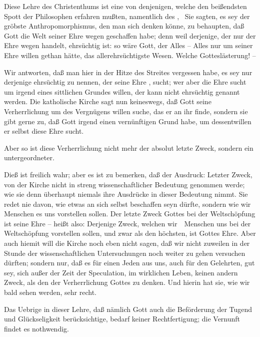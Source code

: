 \begin{aufza}
\item Diese Lehre des Christenthums ist eine von denjenigen, welche den beißendsten Spott der Philosophen erfahren mußten, namentlich des , \uA\ Sie sagten, es sey der gröbste Anthropomorphismus, den man sich denken könne, zu behaupten, daß Gott die Welt seiner Ehre wegen geschaffen habe; denn weil derjenige, der nur der Ehre wegen handelt, ehrsüchtig ist: so wäre Gott, der Alles -- Alles nur um seiner Ehre willen gethan hätte, das allerehrsüchtigste Wesen. Welche Gotteslästerung! --\par
{} Wir antworten, daß man hier in der Hitze des Streites vergessen habe, es sey nur derjenige ehrsüchtig zu nennen, der seine Ehre , sucht; wer aber die Ehre sucht um irgend eines sittlichen Grundes willen, der kann nicht ehrsüchtig genannt werden. Die katholische Kirche sagt nun keineswegs, daß Gott seine Verherrlichung um des Vergnügens willen suche, das er an ihr finde, sondern sie gibt gerne zu, daß Gott irgend einen vernünftigen Grund habe, um dessentwillen er selbst diese Ehre sucht.
\item {} Aber so ist diese Verherrlichung nicht mehr der absolut letzte Zweck, sondern ein untergeordneter.\par
{} Dieß ist freilich wahr; aber es ist zu bemerken, daß der Ausdruck: Letzter Zweck, von der Kirche nicht in streng wissenschaftlicher Bedeutung genommen werde; wie sie denn überhaupt niemals ihre Ausdrücke in dieser Bedeutung nimmt. Sie redet nie davon, wie etwas an sich selbst beschaffen seyn dürfte, sondern wie wir Menschen es uns vorstellen sollen. Der letzte Zweck Gottes bei der Weltschöpfung ist seine Ehre -- heißt also: Derjenige Zweck, welchen wir~\ Menschen uns bei der Weltschöpfung vorstellen sollen, und zwar als den höchsten, ist Gottes Ehre. Aber auch hiemit will die Kirche noch eben nicht sagen, daß wir nicht zuweilen in der Stunde der wissenschaftlichen Untersuchungen noch weiter zu gehen versuchen dürften; sondern nur, daß es für einen Jeden aus uns, auch für den Gelehrten, gut sey, sich außer der Zeit der Speculation, im wirklichen Leben, keinen andern Zweck, als den der Verherrlichung Gottes zu denken. Und hierin hat sie, wie wir bald sehen werden, sehr recht.
\item Das Uebrige in dieser Lehre, daß nämlich Gott auch die Beförderung der Tugend und Glückseligkeit berücksichtige, bedarf keiner Rechtfertigung; die Vernunft findet es nothwendig.
\end{aufza}

